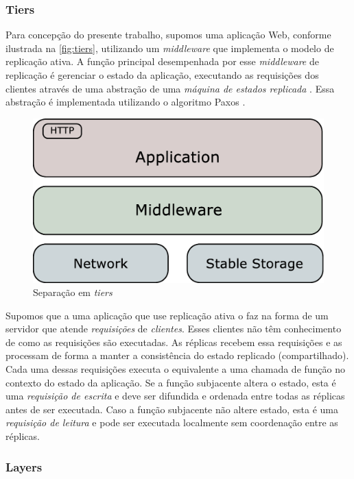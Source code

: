 \subsubsection{Tiers}

Para concepção do presente trabalho, supomos uma aplicação Web, conforme ilustrada na
\autoref{fig:tiers}, utilizando um \emph{middleware} que implementa o modelo de replicação
ativa. A função principal desempenhada por esse \emph{middleware} de replicação é
gerenciar o estado da aplicação, executando as requisições dos clientes através de uma
abstração de uma \emph{máquina de estados replicada} \cite{schneider90}. Essa abstração é
implementada utilizando o algoritmo Paxos \cite{lamport98}.

\begin{figure}[ht]
  \centering
  \includegraphics[width=12cm]{conteudo/capitulos/figuras/block-simple.eps}
  \caption{Separação em \emph{tiers}}
  \label{fig:tiers}
\end{figure}

Supomos que a uma aplicação que use replicação ativa o faz na forma de um servidor que
atende \emph{requisições} de \emph{clientes}. Esses clientes não têm conhecimento de como
as requisições são executadas. As réplicas recebem essa requisições e as processam de forma
a manter a consistência do estado replicado (compartilhado). Cada uma dessas requisições
executa o equivalente a uma chamada de função no contexto do estado da aplicação. Se a
função subjacente altera o estado, esta é uma \emph{requisição de escrita} e deve ser
difundida e ordenada entre todas as réplicas antes de ser executada. Caso a função
subjacente não altere estado, esta é uma \emph{requisição de leitura} e pode ser executada
localmente sem coordenação entre as réplicas.

\subsubsection{Layers}

